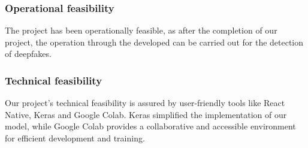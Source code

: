 \subsubsection{Operational feasibility}
The project has been operationally feasible, as after the completion of our project, the operation through the developed can be carried out for the detection of deepfakes.

\subsubsection{Technical feasibility}
Our project's technical feasibility is assured by user-friendly tools like React Native, Keras and Google Colab. Keras simplified the implementation of our model, while Google Colab provides a collaborative and accessible environment for efficient development and training.

